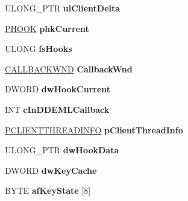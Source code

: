 \begin{DoxyCompactItemize}
U\+L\+O\+N\+G\+\_\+\+P\+TR {\bfseries ul\+Client\+Delta}
\item 
\mbox{\label{struct___c_l_i_e_n_t_i_n_f_o_a750f0fa9bc96c3a3d48cb9bd2776608a}} 
\hyperlink{structtag_h_o_o_k}{P\+H\+O\+OK} {\bfseries phk\+Current}
\item 
\mbox{\label{struct___c_l_i_e_n_t_i_n_f_o_a358538f285b2a375f5ff35e2907cc9d2}} 
U\+L\+O\+NG {\bfseries fs\+Hooks}
\item 
\mbox{\label{struct___c_l_i_e_n_t_i_n_f_o_aabbe9d20a05745bcd48298063e8fe43d}} 
\hyperlink{struct___c_a_l_l_b_a_c_k_w_n_d}{C\+A\+L\+L\+B\+A\+C\+K\+W\+ND} {\bfseries Callback\+Wnd}
\item 
\mbox{\label{struct___c_l_i_e_n_t_i_n_f_o_a756f1e7c9dd9b3bb3a8ff2d34f620e0e}} 
D\+W\+O\+RD {\bfseries dw\+Hook\+Current}
\item 
\mbox{\label{struct___c_l_i_e_n_t_i_n_f_o_ac80222bec2a8e0f228d79e49820c1dd8}} 
I\+NT {\bfseries c\+In\+D\+D\+E\+M\+L\+Callback}
\item 
\mbox{\label{struct___c_l_i_e_n_t_i_n_f_o_a38b083b4b667e762a985720101cad991}} 
\hyperlink{struct___c_l_i_e_n_t_t_h_r_e_a_d_i_n_f_o}{P\+C\+L\+I\+E\+N\+T\+T\+H\+R\+E\+A\+D\+I\+N\+FO} {\bfseries p\+Client\+Thread\+Info}
\item 
\mbox{\label{struct___c_l_i_e_n_t_i_n_f_o_ac1a1c973ae3d69e35b8b2092673f263b}} 
U\+L\+O\+N\+G\+\_\+\+P\+TR {\bfseries dw\+Hook\+Data}
\item 
\mbox{\label{struct___c_l_i_e_n_t_i_n_f_o_a506d0f4d44269d35eb385a435a3cdd96}} 
D\+W\+O\+RD {\bfseries dw\+Key\+Cache}
\item 
\mbox{\label{struct___c_l_i_e_n_t_i_n_f_o_af6f27f70d7c64c0f1fae71dc8f64989e}} 
B\+Y\+TE {\bfseries af\+Key\+State} \mbox{[}8\mbox{]}
\item 
\mbox{\label{struct___c_l_i_e_n_t_i_n_f_o_a5becdeb696a7523b2802c3bc61a6b4f6}} 

\end{DoxyCompactItemize}
